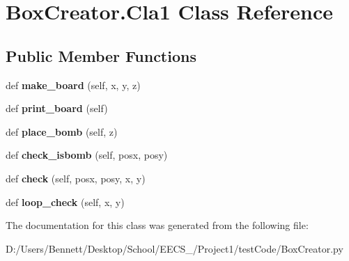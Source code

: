 \hypertarget{class_box_creator_1_1_cla1}{}\section{Box\+Creator.\+Cla1 Class Reference}
\label{class_box_creator_1_1_cla1}
\subsection*{Public Member Functions}
\begin{DoxyCompactItemize}
\item 
\mbox{\label{class_box_creator_1_1_cla1_a12807061f13576d2711e86bcb5935fe9}} 
def {\bfseries make\+\_\+board} (self, x, y, z)
\item 
\mbox{\label{class_box_creator_1_1_cla1_a66a67420acc87d9a393617d6d6633810}} 
def {\bfseries print\+\_\+board} (self)
\item 
\mbox{\label{class_box_creator_1_1_cla1_ac8761bf13a24eabda35c56e9627462fb}} 
def {\bfseries place\+\_\+bomb} (self, z)
\item 
\mbox{\label{class_box_creator_1_1_cla1_a31b342197cdeacf32726c4e10c437d69}} 
def {\bfseries check\+\_\+isbomb} (self, posx, posy)
\item 
\mbox{\label{class_box_creator_1_1_cla1_a7499b0b41adf85133726d2319a9a7311}} 
def {\bfseries check} (self, posx, posy, x, y)
\item 
\mbox{\label{class_box_creator_1_1_cla1_aa115a78d18eafd0648504512848bcc46}} 
def {\bfseries loop\+\_\+check} (self, x, y)
\end{DoxyCompactItemize}


The documentation for this class was generated from the following file\+:\begin{DoxyCompactItemize}
\item 
D\+:/\+Users/\+Bennett/\+Desktop/\+School/\+E\+E\+C\+S\+\_/\+Project1/test\+Code/Box\+Creator.\+py\end{DoxyCompactItemize}

